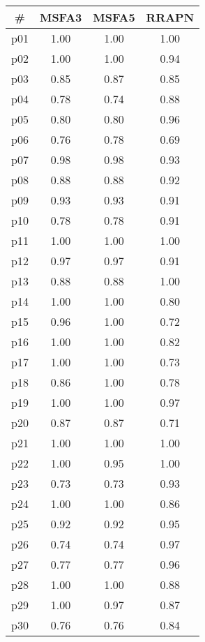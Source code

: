 \begin{tabular}{cccc}
\toprule
\textbf{\#} & \textbf{MSFA3} & \textbf{MSFA5} & \textbf{RRAPN}\\
\midrule
p01 & 1.00 & 1.00 & 1.00\\
p02 & 1.00 & 1.00 & 0.94\\
p03 & 0.85 & 0.87 & 0.85\\
p04 & 0.78 & 0.74 & 0.88\\
p05 & 0.80 & 0.80 & 0.96\\
p06 & 0.76 & 0.78 & 0.69\\
p07 & 0.98 & 0.98 & 0.93\\
p08 & 0.88 & 0.88 & 0.92\\
p09 & 0.93 & 0.93 & 0.91\\
p10 & 0.78 & 0.78 & 0.91\\
p11 & 1.00 & 1.00 & 1.00\\
p12 & 0.97 & 0.97 & 0.91\\
p13 & 0.88 & 0.88 & 1.00\\
p14 & 1.00 & 1.00 & 0.80\\
p15 & 0.96 & 1.00 & 0.72\\
p16 & 1.00 & 1.00 & 0.82\\
p17 & 1.00 & 1.00 & 0.73\\
p18 & 0.86 & 1.00 & 0.78\\
p19 & 1.00 & 1.00 & 0.97\\
p20 & 0.87 & 0.87 & 0.71\\
p21 & 1.00 & 1.00 & 1.00\\
p22 & 1.00 & 0.95 & 1.00\\
p23 & 0.73 & 0.73 & 0.93\\
p24 & 1.00 & 1.00 & 0.86\\
p25 & 0.92 & 0.92 & 0.95\\
p26 & 0.74 & 0.74 & 0.97\\
p27 & 0.77 & 0.77 & 0.96\\
p28 & 1.00 & 1.00 & 0.88\\
p29 & 1.00 & 0.97 & 0.87\\
p30 & 0.76 & 0.76 & 0.84\\
\bottomrule
\end{tabular}

